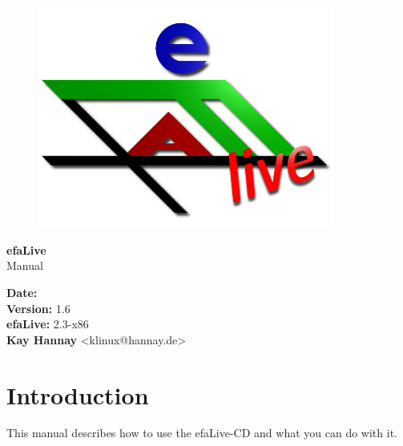 \documentclass[a4paper,12pt,twoside]{article}
\title{\Title}
\author{\Author}
\date{\DocDate}
\begin{document}

\begin{titlepage}
    \vspace*{1cm}
    \begin{center}
        \begin{figure}
            \centering
            \includegraphics[width=9.745cm,height=7.308cm]{efaLiveen-img/efaLiveen-img1.png}
        \end{figure}
        \Huge
        \textbf{efaLive} \\[0.1cm]
        \LARGE
        Manual \\[5cm]
    \end{center}
    \normalsize
    \vspace*{4cm}
    \textbf{Date:} {\DocDate} \\
    \textbf{Version:} 1.6 \\
    \textbf{efaLive:} 2.3-x86 \\
    \textbf{Kay Hannay} <klinux@hannay.de> \\
\end{titlepage}


\tableofcontents
\clearpage\setcounter{page}{1}
\section{Introduction}
This manual describes how to use the efaLive-CD and what you can do with
it.
\end{document}
